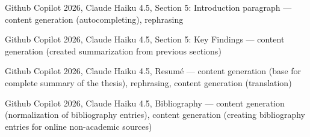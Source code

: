 \begin{trivlist}
\item Github Copilot 2026, Claude Haiku 4.5, Section 5: Introduction paragraph ---
    content generation (autocompleting), rephrasing

\item Github Copilot 2026, Claude Haiku 4.5, Section 5: Key Findings ---
    content generation (created summarization from previous sections)

\item Github Copilot 2026, Claude Haiku 4.5, Resum\'{e} ---
    content generation (base for complete summary of the thesis), rephrasing,
    content generation (translation)

\item Github Copilot 2026, Claude Haiku 4.5, Bibliography ---
    content generation (normalization of bibliography entries),
    content generation (creating bibliography entries for online non-academic
    sources)

\end{trivlist}
